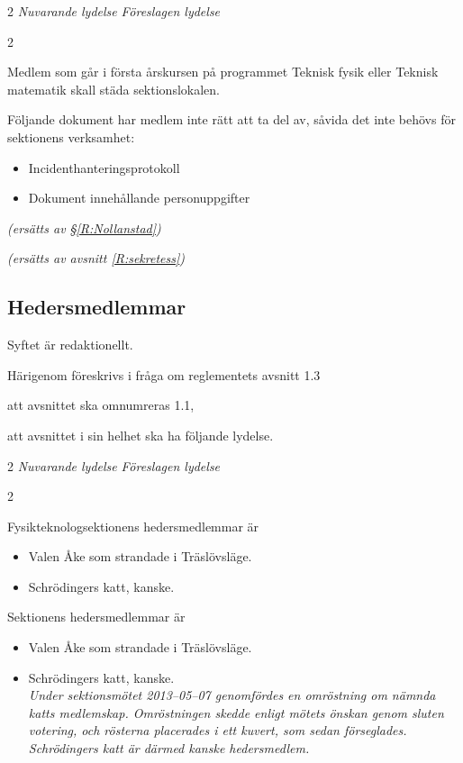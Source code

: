 \documentclass{article}
\newenvironment{lydelse}
    {\begin{paracol}{2}%
        \emph{Nuvarande lydelse}%
        \switchcolumn%
        \emph{Föreslagen lydelse}%
    \end{paracol}%
    \begin{enumerate}[label=\thesubsection.\arabic*]%
    \begin{paracol}{2}%
    }{\end{paracol}\end{enumerate}}
\begin{document}
\begin{lydelse}
    \setcounter{subsection}{1}
    \setcounter{enumi}{0}
    \item Medlem som går i första årskursen på programmet Teknisk fysik eller Teknisk matematik
skall städa sektionslokalen.

    \setcounter{subsection}{2}
    \setcounter{enumi}{0}
    \item Följande dokument har medlem inte rätt att ta del av, såvida det inte behövs för sektionens
verksamhet:
    \begin{itemize}
        \item Incidenthanteringsprotokoll
        \item Dokument innehållande personuppgifter
    \end{itemize}
    
    \setcounter{subsection}{0}
    \switchcolumn
    
    \item[] \emph{(ersätts av \S\ref{R:Nollanstad})}\vspace{2.4em}
    \item[] \emph{(ersätts av avsnitt \ref{R:sekretess})}
\end{lydelse}

\subsection{Hedersmedlemmar}
Syftet är redaktionellt.

Härigenom föreskrivs i fråga om reglementets avsnitt 1.3
\begin{dels}
    \item att avsnittet ska omnumreras 1.1,
    \item att avsnittet i sin helhet ska ha följande lydelse.
\end{dels}

\begin{lydelse}
    \setcounter{subsection}{3}
    \item Fysikteknologsektionens hedersmedlemmar är
    \begin{itemize}
        \item Valen Åke som strandade i Träslövsläge.
        \item Schrödingers katt, kanske.
    \end{itemize}
    \setcounter{subsection}{1}
    
    \switchcolumn
    
    \item  Sektionens hedersmedlemmar är
\begin{itemize}
    \item Valen Åke som strandade i Träslövsläge.
    \item Schrödingers katt, kanske.\\
    {\footnotesize\itshape Under sektionsmötet 2013–05–07 genomfördes en omröstning om nämnda katts medlemskap. Omröstningen skedde enligt mötets önskan genom sluten votering, och rösterna placerades i ett kuvert, som sedan förseglades.
    Schrödingers katt är därmed kanske hedersmedlem.}
\end{itemize}
\end{lydelse}
\end{document}
